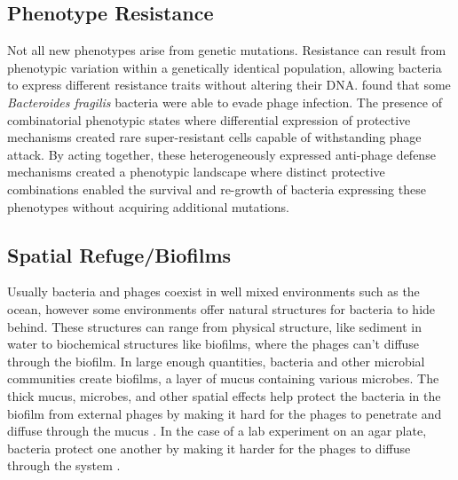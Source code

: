 
\subsection{Phenotype Resistance}
Not all new phenotypes arise from genetic mutations. 
Resistance can result from phenotypic variation within a genetically identical population, allowing bacteria to express different resistance traits without altering their DNA.
\citet{guptaCombinatorialPhenotypicLandscape2025} found that some \textit{Bacteroides fragilis} bacteria were able to evade phage infection.  
The presence of combinatorial phenotypic states where differential expression of protective mechanisms created rare super-resistant cells capable of withstanding phage attack.
By acting together, these heterogeneously expressed anti-phage defense mechanisms created a phenotypic landscape where distinct protective combinations enabled the survival and re-growth of bacteria expressing these phenotypes without acquiring additional mutations. 

\subsection{Spatial Refuge/Biofilms} 
Usually bacteria and phages coexist in well mixed environments such as the ocean, however some environments offer natural structures for bacteria to hide behind. 
These structures can range from physical structure, like sediment in water to biochemical structures like biofilms, where the phages can't diffuse through the biofilm. 
In large enough quantities, bacteria and other microbial communities create biofilms, a layer of mucus containing various microbes. 
The thick mucus, microbes, and other spatial effects help protect the bacteria in the biofilm from external phages by making it hard for the phages to penetrate and diffuse through the mucus \cite{abedonPhageDelayEnhancing2017}. 
In the case of a lab experiment on an agar plate, bacteria protect one another by making it harder for the phages to diffuse through the system \cite{eriksenGrowingMicrocolonyCan2018}. 

